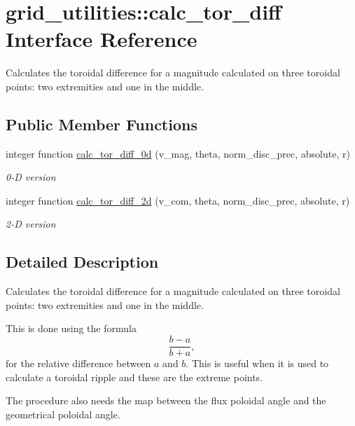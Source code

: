 \hypertarget{interfacegrid__utilities_1_1calc__tor__diff}{}\section{grid\+\_\+utilities\+:\+:calc\+\_\+tor\+\_\+diff Interface Reference}
\label{interfacegrid__utilities_1_1calc__tor__diff}


Calculates the toroidal difference for a magnitude calculated on three toroidal points\+: two extremities and one in the middle.  


\subsection*{Public Member Functions}
\begin{DoxyCompactItemize}
\item 
integer function \hyperlink{interfacegrid__utilities_1_1calc__tor__diff_ad40f28f8c9714e5a1c778ec60994970e}{calc\+\_\+tor\+\_\+diff\+\_\+0d} (v\+\_\+mag, theta, norm\+\_\+disc\+\_\+prec, absolute, r)
\begin{DoxyCompactList}\small\item\em 0-\/D version \end{DoxyCompactList}\item 
integer function \hyperlink{interfacegrid__utilities_1_1calc__tor__diff_ac6c05443dfbf45e43b58d7b62fae5a0b}{calc\+\_\+tor\+\_\+diff\+\_\+2d} (v\+\_\+com, theta, norm\+\_\+disc\+\_\+prec, absolute, r)
\begin{DoxyCompactList}\small\item\em 2-\/D version \end{DoxyCompactList}\end{DoxyCompactItemize}


\subsection{Detailed Description}
Calculates the toroidal difference for a magnitude calculated on three toroidal points\+: two extremities and one in the middle. 

This is done using the formula \[ \frac{b-a}{b+a} , \] for the relative difference between $a$ and $b$. This is useful when it is used to calculate a toroidal ripple and these are the extreme points.

The procedure also needs the map between the flux poloidal angle and the geometrical poloidal angle.

